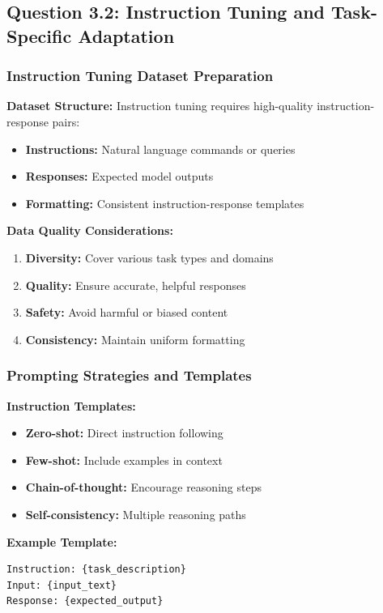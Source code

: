 \documentclass[conference]{IEEEtran}
\begin{document}
\subsection{Question 3.2: Instruction Tuning and Task-Specific Adaptation}
\label{sec:q3_instruction_tuning}

\subsubsection{Instruction Tuning Dataset Preparation}
\label{sec:q3_dataset_prep}

\textbf{Dataset Structure:}
Instruction tuning requires high-quality instruction-response pairs:
\begin{itemize}
  \item \textbf{Instructions:} Natural language commands or queries
  \item \textbf{Responses:} Expected model outputs
  \item \textbf{Formatting:} Consistent instruction-response templates
\end{itemize}

\textbf{Data Quality Considerations:}
\begin{enumerate}
  \item \textbf{Diversity:} Cover various task types and domains
  \item \textbf{Quality:} Ensure accurate, helpful responses
  \item \textbf{Safety:} Avoid harmful or biased content
  \item \textbf{Consistency:} Maintain uniform formatting
\end{enumerate}

\subsubsection{Prompting Strategies and Templates}
\label{sec:q3_prompting}

\textbf{Instruction Templates:}
\begin{itemize}
  \item \textbf{Zero-shot:} Direct instruction following
  \item \textbf{Few-shot:} Include examples in context
  \item \textbf{Chain-of-thought:} Encourage reasoning steps
  \item \textbf{Self-consistency:} Multiple reasoning paths
\end{itemize}

\textbf{Example Template:}
\begin{lstlisting}
Instruction: {task_description}
Input: {input_text}
Response: {expected_output}
\end{lstlisting}
\end{document}
